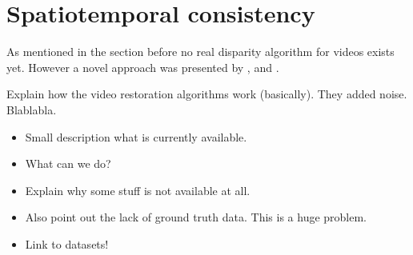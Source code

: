 \section{Spatiotemporal consistency}

As mentioned in the section before no real disparity algorithm for videos exists yet.
However a novel approach was presented by \citep{richardt2010real}, \citep{khoshabeh2011spatio} and \citep{hosni2012temporally}.

Explain how the video restoration algorithms work (basically). They added noise. Blablabla.

\begin{itemize}
  \item Small description what is currently available.
  \item What can we do?
  \item Explain why some stuff is not available at all.
  \item Also point out the lack of ground truth data. This is a huge problem.
  \item Link to datasets!
\end{itemize}

